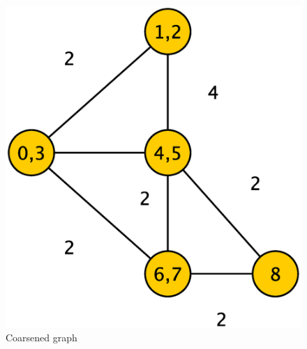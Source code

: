 \documentclass[abstract=on,9pt,twocolumn]{scrartcl}
\begin{document}
\begin{center}
  \begin{figure}[htb]
    \includegraphics[width=\columnwidth]{img/coarsening2.eps}
    \caption{Coarsened graph}
    \label{img:coarse_graph}
  \end{figure}
\end{center}
\end{document}
